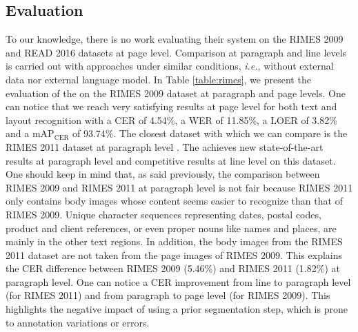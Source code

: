 \subsection{Evaluation}

To our knowledge, there is no work evaluating their system on the RIMES 2009 and READ 2016 datasets at page level. Comparison at paragraph and line levels is carried out with approaches under similar conditions, \textit{i.e.}, without external data nor external language model. In Table \ref{table:rimes}, we present the evaluation of the \modelacc{} on the RIMES 2009 dataset at paragraph and page levels. One can notice that we reach very satisfying results at page level for both text and layout recognition with a CER of 4.54\%, a WER of 11.85\%, a LOER of 3.82\% and a $\mathrm{mAP}_\mathrm{CER}$ of 93.74\%.
The closest dataset with which we can compare is the RIMES 2011 dataset at paragraph level \cite{RIMES}. The \modelacc{} achieves new state-of-the-art results at paragraph level and competitive results at line level on this dataset. One should keep in mind that, as said previously, the comparison between RIMES 2009 and RIMES 2011 at paragraph level is not fair because RIMES 2011 only contains body images whose content seems easier to recognize than that of RIMES 2009. Unique character sequences representing dates, postal codes, product and client references, or even proper nouns like names and places, are mainly in the other text regions. 
In addition, the body images from the RIMES 2011 dataset are not taken from the page images of RIMES 2009. This explains the CER difference between RIMES 2009 (5.46\%) and RIMES 2011 (1.82\%) at paragraph level. One can notice a CER improvement from line to paragraph level (for RIMES 2011) and from paragraph to page level (for RIMES 2009). This highlights the negative impact of using a prior segmentation step, which is prone to annotation variations or errors.

